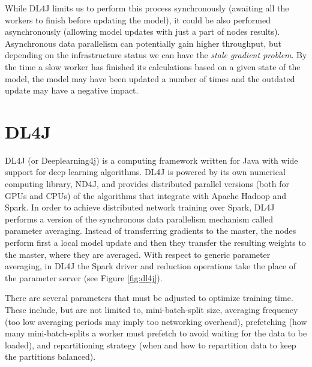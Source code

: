 \documentclass[journal]{IEEEtran}
\begin{document}
While DL4J limits us to perform this process synchronously (awaiting all the workers to finish before updating the model), it could be also performed asynchronously (allowing model updates with just a part of nodes results). Asynchronous data parallelism can potentially gain higher throughput, but depending on the infrastructure status we can have the {\it stale gradient problem}. By the time a slow worker has finished its calculations based on a given state of the model, the model may have been updated a number of times and the outdated update may have a negative impact.


\section{DL4J}
\label{sec:spark}
DL4J (or Deeplearning4j) is a computing framework written for Java with wide support for deep learning algorithms. DL4J is powered by its own numerical computing library, ND4J, and provides distributed parallel versions (both for GPUs and CPUs) of the algorithms that integrate with Apache Hadoop and Spark. In order to achieve distributed network training over Spark, DL4J performs a version of the synchronous data parallelism mechanism called parameter averaging. Instead of transferring gradients to the master, the nodes perform first a local model update and then they transfer the resulting weights to the master, where they are averaged. With respect to generic parameter averaging, in DL4J the Spark driver and reduction operations take the place of the parameter server (see Figure \ref{fig:dl4j}). 

There are several parameters that must be adjusted to optimize training time. These include, but are not limited to, mini-batch-split size, averaging frequency (too low averaging periods may imply too networking overhead), prefetching (how many mini-batch-splits a worker must prefetch to avoid waiting for the data to be loaded), and repartitioning strategy (when and how to repartition data to keep the partitions balanced).
\end{document}
